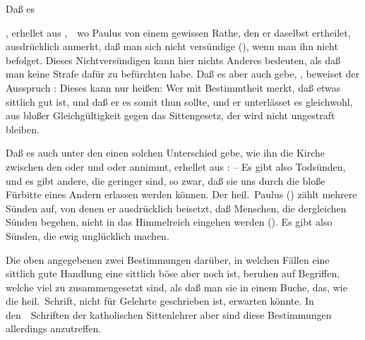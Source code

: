 \begin{aufza}
\item Daß es
\begin{aufzb}
\item {}, erhellet aus  ,~\ wo Paulus von einem gewissen Rathe, den er daselbst ertheilet, ausdrücklich anmerkt, daß man sich nicht versündige (), wenn man ihn nicht befolget. Dieses Nichtversündigen kann hier nichts Anderes bedeuten, als daß man keine Strafe dafür zu befürchten habe. Daß es aber auch  gebe, , beweiset der Ausspruch :   Dieses kann nur heißen: Wer mit Bestimmtheit merkt, daß etwas sittlich gut ist, und daß er es somit thun sollte, und er unterlässet es gleichwohl, aus bloßer Gleichgültigkeit gegen das Sittengesetz, der wird nicht ungestraft bleiben.
\item Daß es auch unter den  einen solchen Unterschied gebe, wie ihn die Kirche zwischen den  oder  und  oder  annimmt, erhellet aus :  -- Es gibt also Todsünden, und es gibt andere, die geringer sind, so zwar, daß sie uns durch die bloße Fürbitte eines Andern erlassen werden können. Der heil.\ Paulus () zählt mehrere Sünden auf, von denen er ausdrücklich beisetzt, daß Menschen, die dergleichen Sünden begehen, nicht in das Himmelreich eingehen werden (). Es gibt also Sünden, die ewig unglücklich machen.
\end{aufzb}
\item Die oben angegebenen zwei Bestimmungen darüber, in welchen Fällen eine sittlich gute Handlung  eine sittlich böse aber noch  ist, beruhen auf Begriffen, welche viel zu zusammengesetzt sind, als daß man sie in einem Buche, das, wie die heil.\ Schrift, nicht für Gelehrte geschrieben ist, erwarten könnte. In den~\ Schriften der katholischen Sittenlehrer aber sind diese Bestimmungen allerdings anzutreffen.

\end{aufza}
